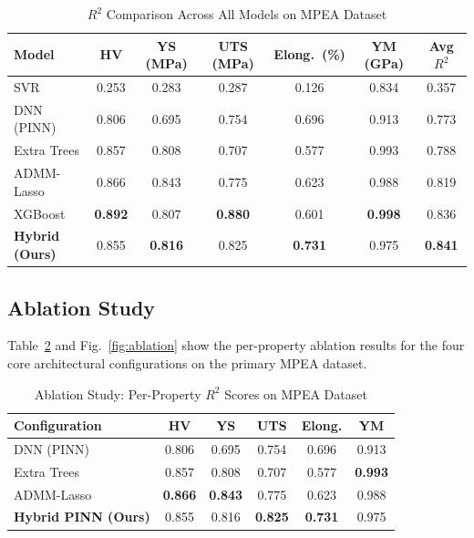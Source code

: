 \documentclass[conference]{IEEEtran}
\begin{document}
\begin{table}[htbp]
\caption{$R^2$ Comparison Across All Models on MPEA Dataset}
\label{tab:compare}
\centering
\renewcommand{\arraystretch}{1.15}
\begin{tabular}{@{}lccccc|c@{}}
\toprule
\textbf{Model} & \textbf{HV} & \textbf{YS (MPa)} & \textbf{UTS (MPa)} & \textbf{Elong.\ (\%)} & \textbf{YM (GPa)} & \textbf{Avg $R^2$} \\
\midrule
SVR & 0.253 & 0.283 & 0.287 & 0.126 & 0.834 & 0.357 \\
DNN (PINN) & 0.806 & 0.695 & 0.754 & 0.696 & 0.913 & 0.773 \\
Extra Trees & 0.857 & 0.808 & 0.707 & 0.577 & 0.993 & 0.788 \\
ADMM-Lasso & 0.866 & 0.843 & 0.775 & 0.623 & 0.988 & 0.819 \\
XGBoost & \textbf{0.892} & 0.807 & \textbf{0.880} & 0.601 & \textbf{0.998} & 0.836 \\
\midrule
\textbf{Hybrid (Ours)} & 0.855 & \textbf{0.816} & 0.825 & \textbf{0.731} & 0.975 & \textbf{0.841} \\
\bottomrule
\end{tabular}
\end{table}

\subsection{Ablation Study}

Table~\ref{tab:ablation} and Fig.~\ref{fig:ablation} show the per-property ablation results for the four core architectural configurations on the primary MPEA dataset.

\begin{table}[htbp]
\caption{Ablation Study: Per-Property $R^2$ Scores on MPEA Dataset}
\label{tab:ablation}
\centering
\small
\renewcommand{\arraystretch}{1.15}
\begin{tabular}{@{}lccccc@{}}
\toprule
\textbf{Configuration} & \textbf{HV} & \textbf{YS} & \textbf{UTS} & \textbf{Elong.} & \textbf{YM} \\
\midrule
DNN (PINN) & 0.806 & 0.695 & 0.754 & 0.696 & 0.913 \\
Extra Trees & 0.857 & 0.808 & 0.707 & 0.577 & \textbf{0.993} \\
ADMM-Lasso & \textbf{0.866} & \textbf{0.843} & 0.775 & 0.623 & 0.988 \\
\midrule
\textbf{Hybrid PINN (Ours)} & 0.855 & 0.816 & \textbf{0.825} & \textbf{0.731} & 0.975 \\
\bottomrule
\end{tabular}
\end{table}
\end{document}
